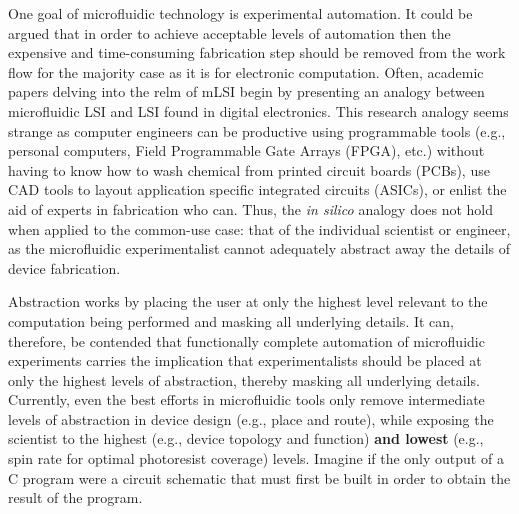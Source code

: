 One goal of microfluidic technology is experimental automation. It could be argued that in order to achieve acceptable levels of automation then the expensive and time-consuming fabrication step should be removed from the work flow for the majority case as it is for electronic computation. Often, academic papers delving into the relm of mLSI begin by presenting an analogy between microfluidic LSI and LSI found in digital electronics. This research analogy seems strange as computer engineers can be productive using programmable tools (e.g., personal computers, Field Programmable Gate Arrays (FPGA), etc.) without having to know how to wash chemical from printed circuit boards (PCBs), use CAD tools to layout application specific integrated circuits (ASICs), or enlist the aid of experts in fabrication who can. Thus, the \emph{in silico} analogy does not hold when applied to the common-use case: that of the individual scientist or engineer, as the microfluidic experimentalist cannot adequately abstract away the details of device fabrication.

Abstraction works by placing the user at only the highest level relevant to the computation being performed and masking all underlying details. It can, therefore, be contended that functionally complete automation of microfluidic experiments carries the implication that experimentalists should be placed at only the highest levels of abstraction, thereby masking all underlying details. Currently, even the best efforts in microfluidic tools only remove intermediate levels of abstraction in device design (e.g., place and route), while exposing the scientist to the highest (e.g., device topology and function) \textbf{and lowest} (e.g., spin rate for optimal photoresist coverage) levels. Imagine if the only output of a C program were a circuit schematic that must first be built in order to obtain the result of the program. 


